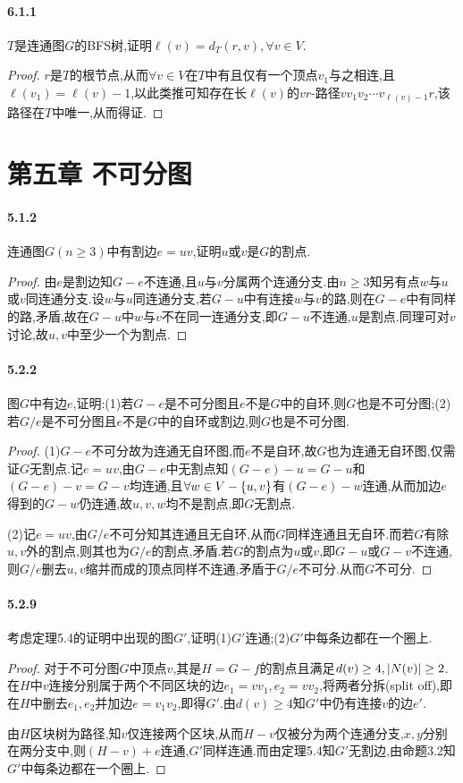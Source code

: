 \documentclass[11pt]{article}
\begin{document}
\paragraph{6.1.1}$T$是连通图$G$的BFS树,证明$\ell(v)=d_T(r,v),\forall v\in V$.
\begin{proof}
$r$是$T$的根节点,从而$\forall v\in V$在$T$中有且仅有一个顶点$v_1$与之相连,且$\ell(v_1)=\ell(v)-1$,以此类推可知存在长$\ell(v)$的$vr$-路径$vv_1v_2\cdots v_{\ell(v)-1}r$,该路径在$T$中唯一,从而得证.
\end{proof}

\section{第五章\; 不可分图}
\paragraph{5.1.2}连通图$G(n\geq 3)$中有割边$e=uv$,证明$u$或$v$是$G$的割点.
\begin{proof}
由$e$是割边知$G-e$不连通,且$u$与$v$分属两个连通分支.由$n\geq 3$知另有点$w$与$u$或$v$同连通分支.设$w$与$u$同连通分支,若$G-u$中有连接$w$与$v$的路,则在$G-e$中有同样的路,矛盾,故在$G-u$中$w$与$v$不在同一连通分支,即$G-u$不连通,$u$是割点.同理可对$v$讨论,故$u,v$中至少一个为割点.
\end{proof}

\paragraph{5.2.2}图$G$中有边$e$,证明:(1)若$G-e$是不可分图且$e$不是$G$中的自环,则$G$也是不可分图;(2)若$G/e$是不可分图且$e$不是$G$中的自环或割边,则$G$也是不可分图.
\begin{proof}
(1)$G-e$不可分故为连通无自环图,而$e$不是自环,故$G$也为连通无自环图,仅需证$G$无割点.记$e=uv$,由$G-e$中无割点知$(G-e)-u=G-u$和$(G-e)-v=G-v$均连通,且$\forall w\in V-\left\{u,v\right\}$有$(G-e)-w$连通,从而加边$e$得到的$G-w$仍连通,故$u,v,w$均不是割点,即$G$无割点.

(2)记$e=uv$,由$G/e$不可分知其连通且无自环,从而$G$同样连通且无自环.而若$G$有除$u,v$外的割点,则其也为$G/e$的割点,矛盾.若$G$的割点为$u$或$v$,即$G-u$或$G-v$不连通,则$G/e$删去$u,v$缩并而成的顶点同样不连通,矛盾于$G/e$不可分.从而$G$不可分.
\end{proof}

\paragraph{5.2.9}考虑定理5.4的证明中出现的图$G'$,证明(1)$G'$连通;(2)$G'$中每条边都在一个圈上.
\begin{proof}
对于不可分图$G$中顶点$v$,其是$H=G-f$的割点且满足$d(v)\geq 4, \left|N(v)\right|\geq 2$.在$H$中$v$连接分别属于两个不同区块的边$e_1=vv_1, e_2=vv_2$,将两者分拆(split off),即在$H$中删去$e_1,e_2$并加边$e=v_1v_2$,即得$G'$.由$d(v)\geq 4$知$G'$中仍有连接$v$的边$e'$.

由$H$区块树为路径,知$v$仅连接两个区块,从而$H-v$仅被分为两个连通分支,$x,y$分别在两分支中,则$(H-v)+e$连通,$G'$同样连通.而由定理5.4知$G'$无割边,由命题3.2知$G'$中每条边都在一个圈上.
\end{proof}
\end{document}
